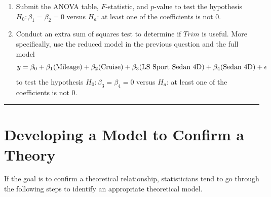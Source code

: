 \documentclass[
]{report}
\begin{document}
\begin{enumerate}
\def\labelenumi{\arabic{enumi}.}
\setcounter{enumi}{29}
\item
  Submit the ANOVA table, \(F\)-statistic, and \(p\)-value to test the hypothesis \(H_0: \beta_1 = \beta_2 = 0\) versus \(H_a\): at least one of the coefficients is not 0.
\item
  Conduct an extra sum of squares test to determine if \(Trim\) is useful. More specifically, use the reduced model in the previous question and the full model
  \begin{equation}
  y = \beta_0 + \beta_1(\text{Mileage}) + \beta_2(\text{Cruise}) + \beta_3(\text{LS Sport Sedan 4D}) + \beta_4(\text{Sedan 4D}) + \epsilon \notag
  \end{equation}
  to test the hypothesis \(H_0: \beta_3 = \beta_4 = 0\) versus \(H_a\): at least one of the coefficients is not 0.
\end{enumerate}

\begin{center}\rule{0.5\linewidth}{0.5pt}\end{center}

\hypertarget{developing-a-model-to-confirm-a-theory}{%
\section{\texorpdfstring{\textbf{Developing a Model to Confirm a Theory}}{Developing a Model to Confirm a Theory}}\label{developing-a-model-to-confirm-a-theory}}

If the goal is to confirm a theoretical relationship, statisticians tend to go through the following steps to identify an appropriate theoretical model.
\end{document}
